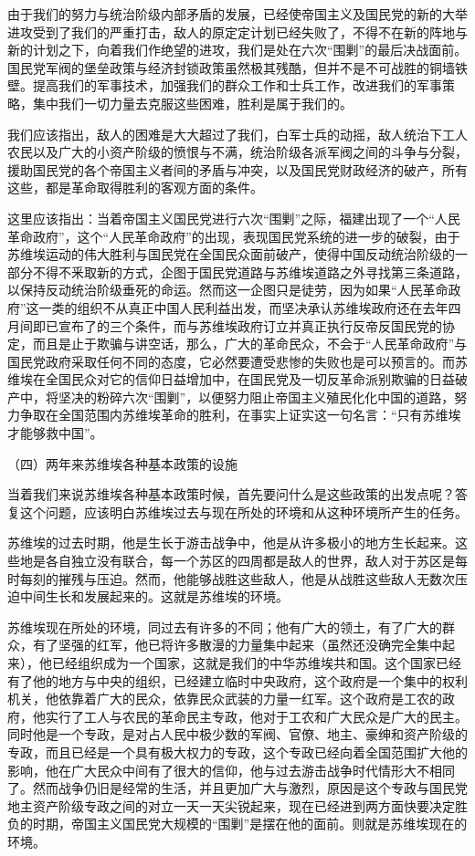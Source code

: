 由于我们的努力与统治阶级内部矛盾的发展，已经使帝国主义及国民党的新的大举进攻受到了我们的严重打击，敌人的原定定计划已经失败了，不得不在新的阵地与新的计划之下，向着我们作绝望的进攻，我们是处在六次“围剿”的最后决战面前。国民党军阀的堡垒政策与经济封锁政策虽然极其残酷，但并不是不可战胜的铜墙铁壁。提高我们的军事技术，加强我们的群众工作和士兵工作，改进我们的军事策略，集中我们一切力量去克服这些困难，胜利是属于我们的。

我们应该指出，敌人的困难是大大超过了我们，白军士兵的动摇，敌人统治下工人农民以及广大的小资产阶级的愤恨与不满，统治阶级各派军阀之间的斗争与分裂，援助国民党的各个帝国主义者间的矛盾与冲突，以及国民党财政经济的破产，所有这些，都是革命取得胜利的客观方面的条件。

这里应该指出：当着帝国主义国民党进行六次“围剿”之际，福建出现了一个“人民革命政府”，这个“人民革命政府”的出现，表现国民党系统的进一步的破裂，由于苏维埃运动的伟大胜利与国民党在全国民众面前破产，使得中国反动统治阶级的一部分不得不釆取新的方式，企图于国民党道路与苏维埃道路之外寻找第三条道路，以保持反动统治阶级垂死的命运。然而这一企图只是徒劳，因为如果“人民革命政府”这一类的组织不从真正中国人民利益出发，而坚决承认苏维埃政府还在去年四月间即已宣布了的三个条件，而与苏维埃政府订立并真正执行反帝反国民党的协定，而且是止于欺骗与讲空话，那么，广大的革命民众，不会于“人民革命政府”与国民党政府采取任何不同的态度，它必然要遭受悲惨的失败也是可以预言的。而苏维埃在全国民众对它的信仰日益增加中，在国民党及一切反革命派别欺骗的日益破产中，将坚决的粉碎六次“围剿”，以便努力阻止帝国主义殖民化化中国的道路，努力争取在全国范围内苏维埃革命的胜利，在事实上证实这一句名言：“只有苏维埃才能够救中国”。

（四）两年来苏维埃各种基本政策的设施

当着我们来说苏维埃各种基本政策时候，首先要问什么是这些政策的出发点呢？答复这个问题，应该明白苏维埃过去与现在所处的环境和从这种环境所产生的任务。

苏维埃的过去时期，他是生长于游击战争中，他是从许多极小的地方生长起来。这些地是各自独立没有联合，每一个苏区的四周都是敌人的世界，敌人对于苏区是每时每刻的摧残与压迫。然而，他能够战胜这些敌人，他是从战胜这些敌人无数次压迫中间生长和发展起来的。这就是苏维埃的环境。

苏维埃现在所处的环境，同过去有许多的不同；他有广大的领土，有了广大的群众，有了坚强的红军，他已将许多散漫的力量集中起来（虽然还没确完全集中起来），他已经组织成为一个国家，这就是我们的中华苏维埃共和国。这个国家已经有了他的地方与中央的组织，已经建立临时中央政府，这个政府是一个集中的权利机关，他依靠着广大的民众，依靠民众武装的力量一红军。这个政府是工农的政府，他实行了工人与农民的革命民主专政，他对于工农和广大民众是广大的民主。同时他是一个专政，是对占人民中极少数的军阀、官僚、地主、豪绅和资产阶级的专政，而且已经是一个具有极大权力的专政，这个专政已经向着全国范围扩大他的影响，他在广大民众中间有了很大的信仰，他与过去游击战争时代情形大不相同了。然而战争仍旧是经常的生活，并且更加广大与激烈，原因是这个专政与国民党地主资产阶级专政之间的对立一天一天尖锐起来，现在已经进到两方面快要决定胜负的时期，帝国主义国民党大规模的“围剿”是摆在他的面前。则就是苏维埃现在的环境。

